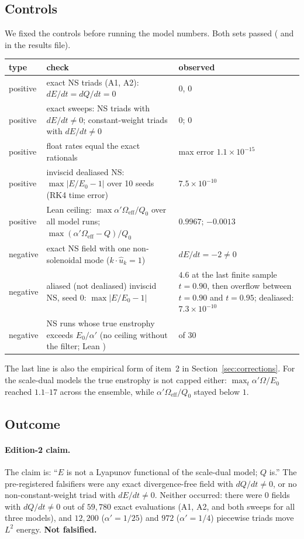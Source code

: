 \documentclass[11pt,a4paper]{article}
\theoremstyle{definition}
\newcommand{\Eff}{\Omega_{\mathrm{eff}}}
\newcommand{\leanc}[1]{\texttt{\detokenize{#1}}}
\begin{document}
\subsection{Controls}
\label{sec:controls}
We fixed the controls before running the model numbers. Both sets passed ( and  in the results file).
\begin{center}\footnotesize
\begin{tabularx}{\textwidth}{@{}l X >{\raggedright\arraybackslash}p{}@{}}
\toprule
type & check & observed \\
\midrule
positive & exact NS triads (A1, A2): $dE/dt=dQ/dt=0$ & $0$, $0$ \\
positive & exact sweeps: NS triads with $dE/dt\ne0$; constant-weight triads with $dE/dt\ne0$ & $0$; $0$ \\
positive & float rates equal the exact rationals & max error $1.1\times10^{-15}$ \\
positive & inviscid dealiased NS: $\max|E/E_0-1|$ over 10 seeds (RK4 time error) & $7.5\times10^{-10}$ \\
positive & Lean ceiling: $\max\alpha'\Eff/Q_0$ over all model runs; $\max(\alpha'\Eff-Q)/Q_0$ & $0.9967$; $-0.0013$ \\
negative & exact NS field with one non-solenoidal mode ($k\cdot\hat u_k=1$) & $dE/dt=-2\ne0$ \\
negative & aliased (not dealiased) inviscid NS, seed 0: $\max|E/E_0-1|$ & $4.6$ at the last finite sample $t=0.90$, then overflow between $t=0.90$ and $t=0.95$; dealiased: $7.3\times10^{-10}$ \\
negative & NS runs whose true enstrophy exceeds $E_0/\alpha'$ (no ceiling without the filter; Lean \leanc{ns_enstrophy_not_capped}) & 30 of 30 \\
\bottomrule
\end{tabularx}
\end{center}
The last line is also the empirical form of item~2 in Section~\ref{sec:corrections}. For the scale-dual models the true enstrophy is not capped either: $\max_t\alpha'\Omega/E_0$ reached $1.1$--$17$ across the ensemble, while $\alpha'\Eff/Q_0$ stayed below $1$.

\subsection{Outcome}
\label{sec:outcome}
\paragraph{Edition-2 claim.} The claim is: ``$E$ is not a Lyapunov functional of the scale-dual model; $Q$ is.'' The pre-registered falsifiers were any exact divergence-free field with $dQ/dt\ne0$, or no non-constant-weight triad with $dE/dt\ne0$. Neither occurred: there were $0$ fields with $dQ/dt\ne0$ out of $59{,}780$ exact evaluations (A1, A2, and both sweeps for all three models), and $12{,}200$ ($\alpha'=1/25$) and $972$ ($\alpha'=1/4$) piecewise triads move $L^2$ energy. \textbf{Not falsified.}
\end{document}
